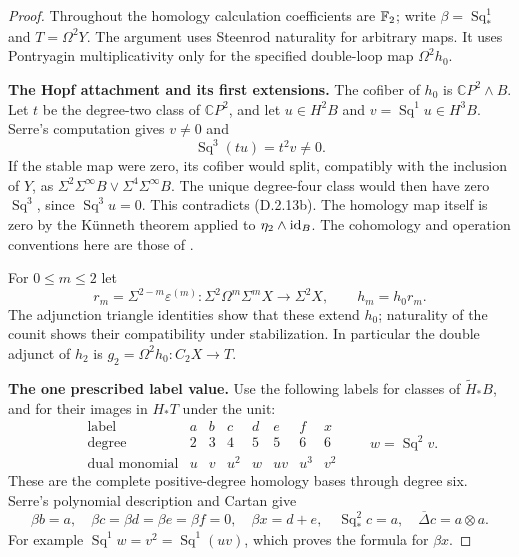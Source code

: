 \begin{proof}
Throughout the homology calculation coefficients are $\mathbb F_2$;
write $\beta=\operatorname{Sq}_*^1$ and $T=\Omega^2Y$.
The argument uses Steenrod naturality for arbitrary maps. It uses
Pontryagin multiplicativity only for the specified double-loop map
$\Omega^2h_0$.

\medskip\noindent
\textbf{The Hopf attachment and its first extensions.}
The cofiber of $h_0$ is $\mathbb CP^2\wedge B$. Let $t$ be the
degree-two class of $\mathbb CP^2$, and let $u\in H^2B$ and
$v=\operatorname{Sq}^1u\in H^3B$. Serre's computation gives
$v\ne0$ and
\[
 \operatorname{Sq}^3(tu)=t^2v\ne0.
 \tag{D.2.13b}
\]
If the stable map were zero, its cofiber would split, compatibly with
the inclusion of $Y$, as $\Sigma^2\Sigma^\infty B\vee
\Sigma^4\Sigma^\infty B$. The unique degree-four class would then
have zero $\operatorname{Sq}^3$, since $\operatorname{Sq}^3u=0$.
This contradicts \textup{(D.2.13b)}. The homology map itself is zero
by the K\"unneth theorem applied to $\eta_2\wedge\mathrm{id}_B$.
The cohomology and operation conventions here are those of
\cite[\S1, nos.~2.1--2.4; \S2, nos.~8--9, pp.~199, 203--204]{I_Serre1953}.

For $0\le m\le2$ let
\[
 r_m=\Sigma^{2-m}\varepsilon^{(m)}:
 \Sigma^2\Omega^m\Sigma^mX\longrightarrow\Sigma^2X,
 \qquad h_m=h_0r_m.
 \tag{D.2.13c}
\]
The adjunction triangle identities show that these extend $h_0$;
naturality of the counit shows their compatibility under stabilization.
In particular the double adjunct of $h_2$ is
$g_2=\Omega^2h_0:C_2X\to T$.

\medskip\noindent
\textbf{The one prescribed label value.}
Use the following labels for classes of $\widetilde H_*B$, and for
their images in $H_*T$ under the unit:
\[
\begin{array}{c|rrrrrrr}
\text{label}&a&b&c&d&e&f&x\\
\text{degree}&2&3&4&5&5&6&6\\
\text{dual monomial}&u&v&u^2&w&uv&u^3&v^2
\end{array}
 \qquad w=\operatorname{Sq}^2v.
 \tag{D.2.13d}
\]
These are the complete positive-degree homology bases through degree
six. Serre's polynomial description and Cartan give
\[
 \beta b=a,\quad \beta c=\beta d=\beta e=\beta f=0,
 \quad\beta x=d+e,\quad \operatorname{Sq}_*^2c=a,
 \quad\overline\Delta c=a\otimes a.
 \tag{D.2.13e}
\]
For example $\operatorname{Sq}^1w=v^2=\operatorname{Sq}^1(uv)$,
which proves the formula for $\beta x$.


\end{proof}
